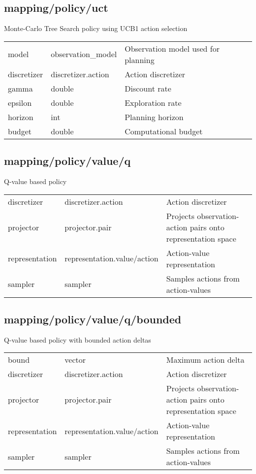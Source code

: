 \subsection{mapping/policy/uct}
\noindent Monte-Carlo Tree Search policy using UCB1 action selection\\

\noindent\begin{tabular}{@{}lll@{}}
model&observation\_model&Observation model used for planning\\
discretizer&discretizer.action&Action discretizer\\
gamma&double&Discount rate\\
epsilon&double&Exploration rate\\
horizon&int&Planning horizon\\
budget&double&Computational budget\\
\end{tabular}
\subsection{mapping/policy/value/q}
\noindent Q-value based policy\\

\noindent\begin{tabular}{@{}lll@{}}
discretizer&discretizer.action&Action discretizer\\
projector&projector.pair&Projects observation-action pairs onto representation space\\
representation&representation.value/action&Action-value representation\\
sampler&sampler&Samples actions from action-values\\
\end{tabular}
\subsection{mapping/policy/value/q/bounded}
\noindent Q-value based policy with bounded action deltas\\

\noindent\begin{tabular}{@{}lll@{}}
bound&vector&Maximum action delta\\
discretizer&discretizer.action&Action discretizer\\
projector&projector.pair&Projects observation-action pairs onto representation space\\
representation&representation.value/action&Action-value representation\\
sampler&sampler&Samples actions from action-values\\
\end{tabular}
